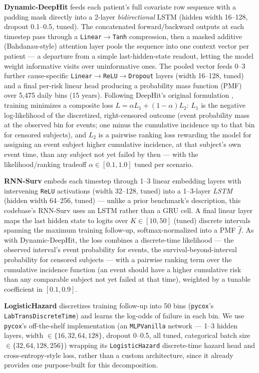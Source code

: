 \textbf{Dynamic-DeepHit} \citep{lee2020dynamicdeephit,lee2018deephit} feeds each patient's full covariate row sequence with a padding mask directly into a 2-layer \emph{bidirectional} LSTM (hidden width 16--128, dropout 0.1--0.5, tuned). The concatenated forward/backward outputs at each timestep pass through a \texttt{Linear}$\to$\texttt{Tanh} compression, then a masked additive (Bahdanau-style) attention layer pools the sequence into one context vector per patient — a departure from a simple last-hidden-state readout, letting the model weight informative visits over uninformative ones. The pooled vector feeds 0--3 further cause-specific \texttt{Linear}$\to$\texttt{ReLU}$\to$\texttt{Dropout} layers (width 16--128, tuned) and a final per-risk linear head producing a probability mass function (PMF) over 5{,}475 daily bins (15 years). Following DeepHit's original formulation \citep{lee2018deephit}, training minimizes a composite loss $L=\alpha L_1+(1-\alpha)L_2$: $L_1$ is the negative log-likelihood of the discretized, right-censored outcome (event probability mass at the observed bin for events; one minus the cumulative incidence up to that bin for censored subjects), and $L_2$ is a pairwise ranking loss rewarding the model for assigning an event subject higher cumulative incidence, at that subject's own event time, than any subject not yet failed by then — with the likelihood/ranking tradeoff $\alpha\in[0.1,1.0]$ tuned per scenario.

\textbf{RNN-Surv} \citep{giunchiglia2018rnn_surv} embeds each timestep through 1--3 linear embedding layers with intervening \texttt{ReLU} activations (width 32--128, tuned) into a 1--3-layer \emph{LSTM} (hidden width 64--256, tuned) — unlike a prior benchmark's description, this codebase's RNN-Surv uses an LSTM rather than a GRU cell. A final linear layer maps the last hidden state to logits over $K\in[10,50]$ (tuned) discrete intervals spanning the maximum training follow-up, softmax-normalized into a PMF $\hat{f}$. As with Dynamic-DeepHit, the loss combines a discrete-time likelihood — the observed interval's event probability for events, the survival-beyond-interval probability for censored subjects — with a pairwise ranking term over the cumulative incidence function (an event should have a higher cumulative risk than any comparable subject not yet failed at that time), weighted by a tunable coefficient in $[0.1,0.9]$.

\textbf{LogisticHazard} discretizes training follow-up into 50 bins (\texttt{pycox}'s \texttt{LabTransDiscreteTime}) and learns the log-odds of failure in each bin. We use \texttt{pycox}'s off-the-shelf implementation (an \texttt{MLPVanilla} network — 1--3 hidden layers, width $\in\{16,32,64,128\}$, dropout 0--0.5, all tuned, categorical batch size $\in\{32,64,128,256\}$) wrapping its \texttt{LogisticHazard} discrete-time hazard head and cross-entropy-style loss, rather than a custom architecture, since it already provides one purpose-built for this decomposition.

